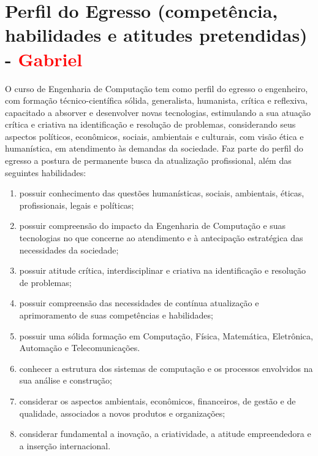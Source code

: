 \section{Perfil do Egresso (competência, habilidades e atitudes pretendidas) - \textcolor{red}{Gabriel}}

O curso de Engenharia de Computação tem como perfil do egresso o engenheiro, com formação técnico-científica sólida, generalista, humanista, crítica e reflexiva, capacitado a absorver e desenvolver novas tecnologias, estimulando a sua atuação crítica e criativa na identificação e resolução de problemas, considerando seus aspectos políticos, econômicos, sociais, ambientais e culturais, com visão ética e humanística, em atendimento às demandas da sociedade. Faz parte do perfil do egresso a postura de permanente busca da atualização profissional, além das seguintes habilidades:
\begin{enumerate} [I -]
	\item possuir conhecimento das questões humanísticas, sociais, ambientais, éticas, profissionais, legais e políticas;
	\item possuir compreensão do impacto da Engenharia de Computação e suas tecnologias no que concerne ao atendimento e à antecipação estratégica das necessidades da sociedade;
	\item possuir atitude crítica, interdisciplinar e criativa na identificação e resolução de problemas;
	\item possuir compreensão das necessidades de contínua atualização e aprimoramento de suas competências e habilidades;
	\item possuir uma sólida formação em Computação, Física, Matemática, Eletrônica, Automação e Telecomunicações.
	\item conhecer a estrutura dos sistemas de computação e os processos envolvidos na sua análise e construção;
	\item considerar os aspectos ambientais, econômicos, financeiros, de gestão e de qualidade, associados a novos produtos e organizações;
	\item considerar fundamental a inovação, a criatividade, a atitude empreendedora e a inserção internacional.
\end{enumerate}

